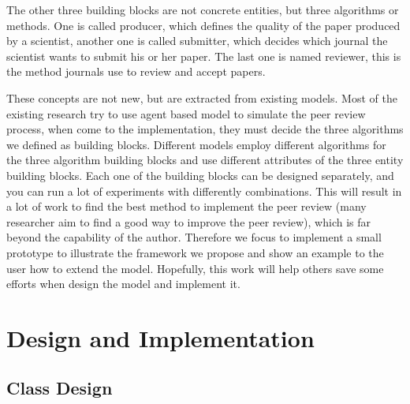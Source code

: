 \documentclass[11pt]{article}
\begin{document}
The other three building blocks are not concrete entities, but three algorithms or methods. One is called producer, which defines the quality of the paper produced by a scientist, another one is called submitter, which decides which journal the scientist wants to submit his or her paper. The last one is named reviewer, this is the method journals use to review and accept papers.

These concepts are not new, but are extracted from existing models. Most of the existing research try to use agent based model to simulate the peer review process, when come to the implementation, they must decide the three algorithms we defined as building blocks. Different models employ different algorithms for the three algorithm building blocks and use different attributes of the three entity building blocks. Each one of the building blocks can be designed separately, and you can run a lot of experiments with differently combinations. This will result in a lot of work to find the best method to implement the peer review (many researcher aim to find a good way to improve the peer review), which is far beyond the capability of the author. Therefore we focus to implement a small prototype to illustrate the framework we propose and show an example to the user how to extend the model. Hopefully, this work will help others save some efforts when design the model and implement it.

\section{Design and Implementation}

\subsection{Class Design}
\end{document}
